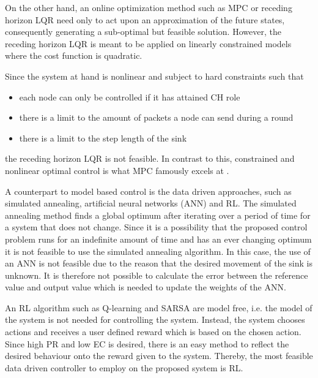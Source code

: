 \noindent On the other hand, an online optimization method such as MPC or receding horizon LQR need only to act upon an approximation of the future states, consequently generating a sub-optimal but feasible solution. However, the receding horizon LQR is meant to be applied on linearly constrained models where the cost function is quadratic.\newline

\noindent Since the system at hand is nonlinear and subject to hard constraints such that
\begin{itemize}
    \item each node can only be controlled if it has attained CH role
    \item there is a limit to the amount of packets a node can send during a round
    \item there is a limit to the step length of the sink
\end{itemize}
the receding horizon LQR is not feasible. In contrast to this, constrained and nonlinear optimal control is what MPC famously excels at \cite{MPCbook}.\newline

\noindent A counterpart to model based control is the data driven approaches, such as simulated annealing, artificial neural networks (ANN) and RL. The simulated annealing method finds a global optimum after iterating over a period of time for a system that does not change. Since it is a possibility that the proposed control problem runs for an indefinite amount of time and has an ever changing optimum it is not feasible to use the simulated annealing algorithm. In this case, the use of an ANN is not feasible due to the reason that the desired movement of the sink is unknown. It is therefore not possible to calculate the error between the reference value and output value which is needed to update the weights of the ANN. \newline

\noindent An RL algorithm such as Q-learning and SARSA are model free, i.e. the model of the system is not needed for controlling the system. Instead, the system chooses actions and receives a user defined reward which is based on the chosen action. Since high PR and low EC is desired, there is an easy method to reflect the desired behaviour onto the reward given to the system. Thereby, the most feasible data driven controller to employ on the proposed system is RL. 

